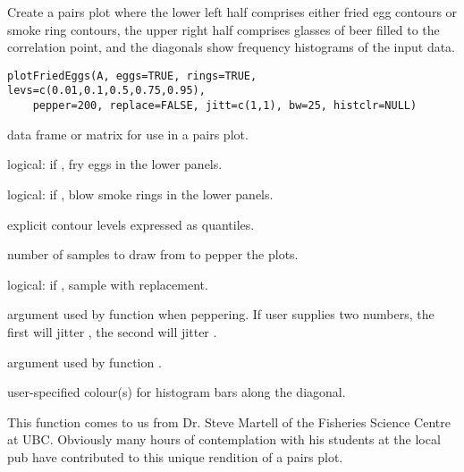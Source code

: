 \documentclass[letterpaper]{book}
\begin{document}
%
\begin{Description}\relax
Create a pairs plot where the lower left half comprises either 
fried egg contours or smoke ring contours, the upper right half 
comprises glasses of beer filled to the correlation point, and 
the diagonals show frequency histograms of the input data.
\end{Description}
%
\begin{Usage}
\begin{verbatim}
plotFriedEggs(A, eggs=TRUE, rings=TRUE, levs=c(0.01,0.1,0.5,0.75,0.95),
    pepper=200, replace=FALSE, jitt=c(1,1), bw=25, histclr=NULL) 
\end{verbatim}
\end{Usage}
%
\begin{Arguments}
\begin{ldescription}
\item[\code{A}] data frame or matrix for use in a pairs plot.
\item[\code{eggs}] logical: if , fry eggs in the lower panels.
\item[\code{rings}] logical: if , blow smoke rings in the lower panels.
\item[\code{levs}] explicit contour levels expressed as quantiles.
\item[\code{pepper}] number of samples to draw from  to pepper the plots.
\item[\code{replace}] logical: if , sample  with replacement.
\item[\code{jitt}] argument  used by function  when peppering.
If user supplies two numbers, the first will jitter , the second will 
jitter .
\item[\code{bw}] argument  used by function .
\item[\code{histclr}] user-specified colour(s) for histogram bars along the diagonal.
\end{ldescription}
\end{Arguments}
%
\begin{Details}\relax
This function comes to us from Dr. Steve Martell of the Fisheries Science 
Centre at UBC. Obviously many hours of contemplation with his students at
the local pub have contributed to this unique rendition of a pairs plot.
\end{Details}
\end{document}

